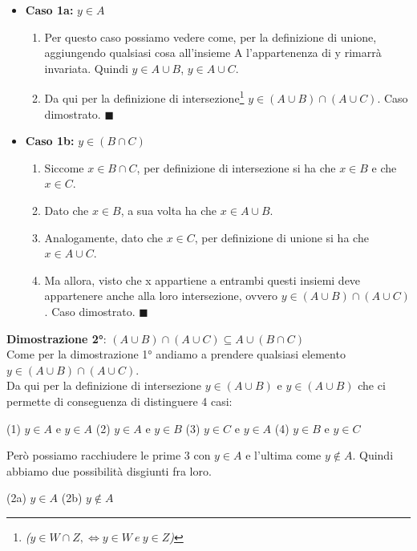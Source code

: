 \begin{itemize}
    \item \textbf{Caso 1a:} $y \in A$
    \begin{enumerate}
        \item Per questo caso possiamo vedere come, per la definizione di unione, aggiungendo qualsiasi cosa all'insieme A l'appartenenza di y rimarrà invariata. Quindi $y \in A \cup B$, $y \in A \cup C$.
        \item Da qui per la definizione di intersezione\footnote{\textit{($y \in W \cap Z, \iff y \in W \: e \: y \in Z$)}} $y \in (A \cup B) \cap (A \cup C)$. Caso dimostrato. $\blacksquare$
    \end{enumerate}
    \item \textbf{Caso 1b:} $y \in (B \cap C)$
    \begin{enumerate}
        \item Siccome $x \in B \cap C$, per definizione di intersezione si ha che $x \in B$ e che $x \in C$.
        \item Dato che $x \in B$, a sua volta ha che $x \in A \cup B$.
        \item Analogamente, dato che $x \in C$, per definizione di unione si ha che $x \in A \cup C$.
        \item Ma allora, visto che x appartiene a entrambi questi insiemi deve appartenere anche alla
        loro intersezione, ovvero $y \in (A \cup B) \cap (A \cup C)$. Caso dimostrato. $\blacksquare$
    \end{enumerate}
\end{itemize}
\textbf{Dimostrazione 2°}: $(A \cup B) \cap (A \cup C) \subseteq A \cup (B \cap C)$ \\
Come per la dimostrazione 1° andiamo a prendere qualsiasi elemento $y \in (A \cup B) \cap (A \cup C)$.\\
Da qui per la definizione di intersezione $y \in (A \cup B)$ e $y \in (A \cup B)$ che ci permette di conseguenza di distinguere 4 casi:
\begin{center}
    (1) $y \in A$ e $y \in A$ \hfill
    (2) $y \in A$ e $y \in B$ \hfill
    (3) $y \in C$ e $y \in A$ \hfill
    (4) $y \in B$ e $y \in C$
\end{center}
Però possiamo racchiudere le prime 3 con $y \in A$ e l'ultima come $y \notin A$. Quindi abbiamo due possibilità disgiunti fra loro.
\begin{center}
    (2a) $y \in A$ \hspace{.5cm}  (2b) $y \notin A$ \\
\end{center}
